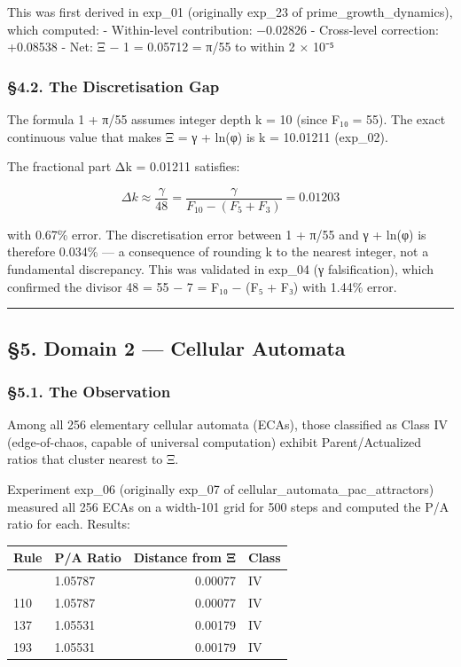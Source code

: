\documentclass[
  11pt,
  a4paper]{article}
\begin{document}
This was first derived in exp\_01 (originally exp\_23 of
prime\_growth\_dynamics), which computed: - Within-level contribution:
−0.02826 - Cross-level correction: +0.08538 - Net: Ξ − 1 = 0.05712 =
π/55 to within 2 × 10⁻⁵

\subsubsection{§4.2. The Discretisation
Gap}\label{the-discretisation-gap}

The formula 1 + π/55 assumes integer depth k = 10 (since F₁₀ = 55). The
exact continuous value that makes Ξ = γ + ln(φ) is k = 10.01211
(exp\_02).

The fractional part Δk = 0.01211 satisfies:

\[\Delta k \approx \frac{\gamma}{48} = \frac{\gamma}{F_{10} - (F_5 + F_3)} = 0.01203\]

with 0.67\% error. The discretisation error between 1 + π/55 and γ +
ln(φ) is therefore 0.034\% --- a consequence of rounding k to the
nearest integer, not a fundamental discrepancy. This was validated in
exp\_04 (γ falsification), which confirmed the divisor 48 = 55 − 7 = F₁₀
− (F₅ + F₃) with 1.44\% error.

\begin{center}\rule{0.5\linewidth}{0.5pt}\end{center}

\subsection{§5. Domain 2 --- Cellular
Automata}\label{domain-2-cellular-automata}

\subsubsection{§5.1. The Observation}\label{the-observation}

Among all 256 elementary cellular automata (ECAs), those classified as
Class IV (edge-of-chaos, capable of universal computation) exhibit
Parent/Actualized ratios that cluster nearest to Ξ.

Experiment exp\_06 (originally exp\_07 of
cellular\_automata\_pac\_attractors) measured all 256 ECAs on a
width-101 grid for 500 steps and computed the P/A ratio for each.
Results:

\begin{longtable}[]{@{}llrl@{}}
\toprule\noalign{}
Rule & P/A Ratio & Distance from Ξ & Class \\
\midrule\noalign{}
\endhead
\bottomrule\noalign{}
\endlastfoot
124 & 1.05787 & 0.00077 & IV \\
110 & 1.05787 & 0.00077 & IV \\
137 & 1.05531 & 0.00179 & IV \\
193 & 1.05531 & 0.00179 & IV \\
\end{longtable}
\end{document}
